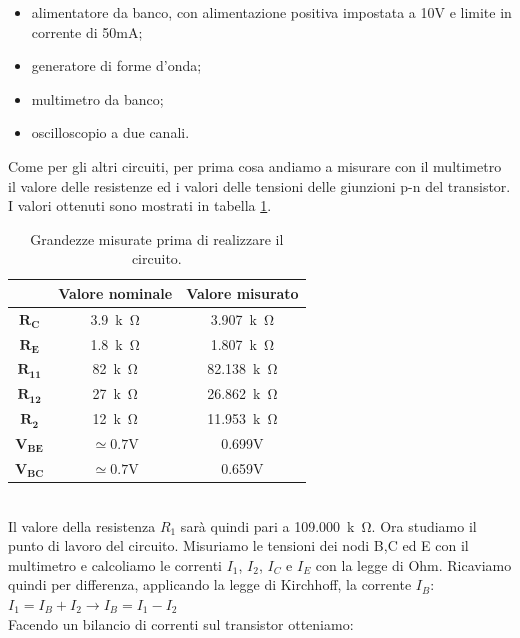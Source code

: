 \documentclass{report}
\begin{document}
\begin{itemize}
\item alimentatore da banco, con alimentazione positiva impostata a 10V e limite in corrente di 50mA;
\item generatore di forme d'onda;
\item multimetro da banco;
\item oscilloscopio a due canali.
\end{itemize}
Come per gli altri circuiti, per prima cosa andiamo a misurare con il multimetro il valore delle resistenze ed i valori delle tensioni delle giunzioni p-n del transistor. I valori ottenuti sono mostrati in tabella \ref{table:CEv3_comp}.
\\
\begin{table}[h]
	\centering
	\begin{tabular}{|c|c|c|}
	\cline{2-3} 
	\multicolumn{1}{c|}{} & \textbf{Valore nominale} & \textbf{Valore misurato}\\ 
		\hline
		$\mathbf{R_{C}}$& \SI{3.9}{k\ohm} & \SI{3.907}{k\ohm} \\ 
		\hline
		$\mathbf{R_{E}}$& \SI{1.8}{k\ohm} & \SI{1.807}{k\ohm} \\ 
		\hline
		$\mathbf{R_{11}}$& \SI{82}{k\ohm} & \SI{82.138}{k\ohm} \\ 
		\hline
		$\mathbf{R_{12}}$& \SI{27}{k\ohm} & \SI{26.862}{k\ohm} \\ 
		\hline
		$\mathbf{R_{2}}$& \SI{12}{k\ohm} & \SI{11.953}{k\ohm} \\ 
		\hline
		$\mathbf{V_{BE}}$& $\mathrm{ \simeq0.7V}$ & 0.699V \\ 
		\hline
		$\mathbf{V_{BC}}$& $\mathrm{ \simeq0.7V}$  & 0.659V \\ 
		\hline
	\end{tabular}
\caption{Grandezze misurate prima di realizzare il circuito.}
\label{table:CEv3_comp}
\end{table}
\\Il valore della resistenza $R_1$ sarà quindi pari a \SI{109.000}{k\ohm}. Ora studiamo il punto di lavoro del circuito. Misuriamo le tensioni dei nodi B,C ed E con il multimetro e calcoliamo le correnti $I_1$, $I_2$, $I_C$ e $I_E$ con la legge di Ohm. Ricaviamo quindi per differenza, applicando la legge di Kirchhoff, la corrente $I_B$:
\\[2pt]\indent $\displaystyle{I_1=I_B+I_2\rightarrow I_B=I_1-I_2}$
\\[2pt]Facendo un bilancio di correnti sul transistor otteniamo:
\end{document}
